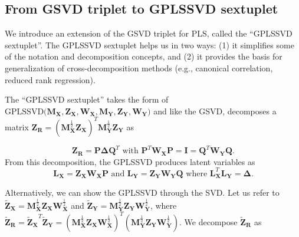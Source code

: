 \documentclass[12pt]{article}
\begin{document}
\hypertarget{from-gsvd-triplet-to-gplssvd-sextuplet}{%
\subsection{From GSVD triplet to GPLSSVD
sextuplet}\label{from-gsvd-triplet-to-gplssvd-sextuplet}}

We introduce an extension of the GSVD triplet for PLS, called the
``GPLSSVD sextuplet''. The GPLSSVD sextuplet helps us in two ways: (1)
it simplifies some of the notation and decomposition concepts, and (2)
it provides the basis for generalization of cross-decomposition methods
(e.g., canonical correlation, reduced rank regression).

The ``GPLSSVD sextuplet'' takes the form of
\(\mathrm{GPLSSVD(} {\mathbf M}_{\mathbf X}, {\mathbf Z}_{\mathbf X}, {\mathbf W}_{\mathbf X}, {\mathbf M}_{\mathbf Y}, {\mathbf Z}_{\mathbf Y}, {\mathbf W}_{\mathbf Y} \mathrm{)}\)
and like the GSVD, decomposes a matrix
\({\mathbf Z}_{\mathbf R} = ({\mathbf M}_{\mathbf X}^{\frac{1}{2}}{\mathbf Z}_{\mathbf X})^{T} {\mathbf M}_{\mathbf Y}^{\frac{1}{2}} {\mathbf Z}_{\mathbf Y}\)
as

\begin{equation}
{\mathbf Z}_{\mathbf R} = {\mathbf P} {\boldsymbol \Delta} {\mathbf Q}^{T}
\textrm{ with }
{\mathbf P}^{T}{\mathbf W}_{\mathbf X}{\mathbf P} = {\mathbf I} =
{\mathbf Q}^{T}{\mathbf W}_{\mathbf Y}{\mathbf Q}.
\end{equation} From this decomposition, the GPLSSVD produces latent
variables as \begin{equation}
{\mathbf L}_{\mathbf X} 
= {\mathbf Z}_{\mathbf X}{\mathbf W}_{\mathbf X}{\mathbf P} 
\textrm{ and } 
{\mathbf L}_{\mathbf Y} = 
{\mathbf Z}_{\mathbf Y}{\mathbf W}_{\mathbf Y}{\mathbf Q}
\textrm{ where }
{\mathbf L}_{\mathbf X}^{T} {\mathbf L}_{\mathbf Y} 
= {\boldsymbol \Delta}. 
\end{equation}

Alternatively, we can show the GPLSSVD through the SVD. Let us refer to
\({\widetilde{\mathbf Z}_{\mathbf X}} = {\mathbf M}_{\mathbf X}^{\frac{1}{2}}{\mathbf Z}_{\mathbf X}{\mathbf W}_{\mathbf X}^{\frac{1}{2}}\)
and
\({\widetilde{\mathbf Z}_{\mathbf Y}} = {\mathbf M}_{\mathbf Y}^{\frac{1}{2}}{\mathbf Z}_{\mathbf Y}{\mathbf W}_{\mathbf Y}^{\frac{1}{2}}\),
where
\(\widetilde{\mathbf Z}_{\mathbf R} = {\widetilde{\mathbf Z}_{\mathbf X}}^{T}{\widetilde{\mathbf Z}_{\mathbf Y}} = ({\mathbf M}_{\mathbf X}^{\frac{1}{2}}{\mathbf Z}_{\mathbf X}{\mathbf W}_{\mathbf X}^{\frac{1}{2}})^{T}({\mathbf M}_{\mathbf Y}^{\frac{1}{2}}{\mathbf Z}_{\mathbf Y}{\mathbf W}_{\mathbf Y}^{\frac{1}{2}})\).
We decompose \(\widetilde{\mathbf Z}_{\mathbf R}\) as
\end{document}
